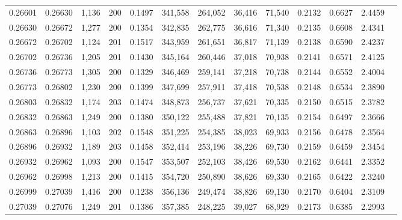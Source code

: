 \begin{tabular}{rrrrrrrrrrrrr}
0.26601 & 0.26630 & 1,136 & 200 &                                     0.1497 & 341,558 & 264,052 &  36,416 &  71,540 & 0.2132 & 0.6627 & 2.4459 \\
0.26630 & 0.26672 & 1,277 & 200 &                                     0.1354 & 342,835 & 262,775 &  36,616 &  71,340 & 0.2135 & 0.6608 & 2.4341 \\
0.26672 & 0.26702 & 1,124 & 201 &                                     0.1517 & 343,959 & 261,651 &  36,817 &  71,139 & 0.2138 & 0.6590 & 2.4237 \\
0.26702 & 0.26736 & 1,205 & 201 &                                     0.1430 & 345,164 & 260,446 &  37,018 &  70,938 & 0.2141 & 0.6571 & 2.4125 \\
0.26736 & 0.26773 & 1,305 & 200 &                                     0.1329 & 346,469 & 259,141 &  37,218 &  70,738 & 0.2144 & 0.6552 & 2.4004 \\
0.26773 & 0.26802 & 1,230 & 200 &                                     0.1399 & 347,699 & 257,911 &  37,418 &  70,538 & 0.2148 & 0.6534 & 2.3890 \\
0.26803 & 0.26832 & 1,174 & 203 &                                     0.1474 & 348,873 & 256,737 &  37,621 &  70,335 & 0.2150 & 0.6515 & 2.3782 \\
0.26832 & 0.26863 & 1,249 & 200 &                                     0.1380 & 350,122 & 255,488 &  37,821 &  70,135 & 0.2154 & 0.6497 & 2.3666 \\
0.26863 & 0.26896 & 1,103 & 202 &                                     0.1548 & 351,225 & 254,385 &  38,023 &  69,933 & 0.2156 & 0.6478 & 2.3564 \\
0.26896 & 0.26932 & 1,189 & 203 &                                     0.1458 & 352,414 & 253,196 &  38,226 &  69,730 & 0.2159 & 0.6459 & 2.3454 \\
0.26932 & 0.26962 & 1,093 & 200 &                                     0.1547 & 353,507 & 252,103 &  38,426 &  69,530 & 0.2162 & 0.6441 & 2.3352 \\
0.26962 & 0.26998 & 1,213 & 200 &                                     0.1415 & 354,720 & 250,890 &  38,626 &  69,330 & 0.2165 & 0.6422 & 2.3240 \\
0.26999 & 0.27039 & 1,416 & 200 &                                     0.1238 & 356,136 & 249,474 &  38,826 &  69,130 & 0.2170 & 0.6404 & 2.3109 \\
0.27039 & 0.27076 & 1,249 & 201 &                                     0.1386 & 357,385 & 248,225 &  39,027 &  68,929 & 0.2173 & 0.6385 & 2.2993 \\

\end{tabular}
